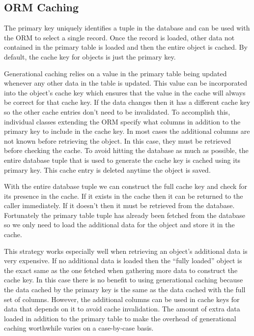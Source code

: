 \documentclass[12pt]{ucthesis}
\begin{document}
\subsection{ORM Caching}
The primary key uniquely identifies a tuple in the database and can be used with the ORM to select a single record.
Once the record is loaded, other data not contained in the primary table is loaded and then the entire object is cached.
By default, the cache key for objects is just the primary key.

Generational caching relies on a value in the primary table being updated whenever any other data in the table is updated.
This value can be incorporated into the object's cache key which ensures that the value in the cache will always be correct for that cache key.
If the data changes then it has a different cache key so the other cache entries don't need to be invalidated.
To accomplish this, individual classes extending the ORM specify what columns in addition to the primary key to include in the cache key.
In most cases the additional columns are not known before retrieving the object.
In this case, they must be retrieved before checking the cache.
To avoid hitting the database as much as possible, the entire database tuple that is used to generate the cache key is cached using its primary key.
This cache entry is deleted anytime the object is saved.

With the entire database tuple we can construct the full cache key and check for its presence in the cache.
If it exists in the cache then it can be returned to the caller immediately.
If it doesn't then it must be retrieved from the database.
Fortunately the primary table tuple has already been fetched from the database so we only need to load the additional data for the object and store it in the cache.

This strategy works especially well when retrieving an object's additional data is very expensive.
If no additional data is loaded then the ``fully loaded'' object is the exact same as the one fetched when gathering more data to construct the cache key.
In this case there is no benefit to using generational caching because the data cached by the primary key is the same as the data cached with the full set of columns.
However, the additional columns can be used in cache keys for data that depends on it to avoid cache invalidation.
The amount of extra data loaded in addition to the primary table to make the overhead of generational caching worthwhile varies on a case-by-case basis.
\end{document}
